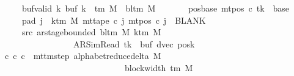 \begin{isabellebody}
\ \ \ \ \ \ \ buf{}{\isacharunderscore}{\kern0pt}valid{\isacharcolon}{\kern0pt}\ {\isachardoublequoteopen}{\isasymforall}k{\isachardot}{\kern0pt}\ buf{}\ k\ {\isasymin}\ {\isasymGamma}{\isacharunderscore}{\kern0pt}tm\ M\ {\isasymunion}\ {\isacharbraceleft}{\kern0pt}bl{\isacharunderscore}{\kern0pt}tm\ M{\isacharbraceright}{\kern0pt}{\isachardoublequoteclose}\isanewline
\ \ \ \ \ \ \ pos{\isacharunderscore}{\kern0pt}base{\isacharcolon}{\kern0pt}\ {\isachardoublequoteopen}mt{\isacharunderscore}{\kern0pt}pos\ c{\isacharprime}{\kern0pt}\ tk\ {\isacharequal}{\kern0pt}\ base{\isachardoublequoteclose}\isanewline
\ \ \ \ \ \ \ pad{}{\isacharcolon}{\kern0pt}\ {\isachardoublequoteopen}{\isasymforall}j\ {\isasymge}\ k{\isacharunderscore}{\kern0pt}tm\ M{\isachardot}{\kern0pt}\ mt{\isacharunderscore}{\kern0pt}tape\ c{\isacharprime}{\kern0pt}\ j\ {\isacharparenleft}{\kern0pt}mt{\isacharunderscore}{\kern0pt}pos\ c{\isacharprime}{\kern0pt}\ j{\isacharparenright}{\kern0pt}\ {\isacharequal}{\kern0pt}\ BLANK{}{\isachardoublequoteclose}\isanewline
\ \ \ \ \ \ \ src{}{\isacharcolon}{\kern0pt}\ {\isachardoublequoteopen}ar{\isacharunderscore}{\kern0pt}stage{\isacharunderscore}{\kern0pt}bounded\ {\isacharparenleft}{\kern0pt}bl{\isacharunderscore}{\kern0pt}tm\ M{\isacharparenright}{\kern0pt}\ {\isacharparenleft}{\kern0pt}k{\isacharunderscore}{\kern0pt}tm\ M{\isacharparenright}{\kern0pt}\isanewline
\ \ \ \ \ \ \ \ \ \ \ \ \ \ \ \ \ \ \ {\isacharparenleft}{\kern0pt}AR{\isacharunderscore}{\kern0pt}SimRead{\isacharcomma}{\kern0pt}\ tk{\isacharcomma}{\kern0pt}\ {}{\isacharcomma}{\kern0pt}\ buf{}{\isacharcomma}{\kern0pt}\ dvec{\isacharcomma}{\kern0pt}\ posk{\isacharparenright}{\kern0pt}{\isachardoublequoteclose}\isanewline
\ \ \ {\isachardoublequoteopen}{\isasymexists}c{\isacharprime}{\kern0pt}{\isacharprime}{\kern0pt}{\isachardot}{\kern0pt}\ {\isacharparenleft}{\kern0pt}c{\isacharprime}{\kern0pt}{\isacharcomma}{\kern0pt}\ c{\isacharprime}{\kern0pt}{\isacharprime}{\kern0pt}{\isacharparenright}{\kern0pt}\ {\isasymin}\ {\isacharparenleft}{\kern0pt}mttm{\isacharunderscore}{\kern0pt}step\ {\isacharparenleft}{\kern0pt}alphabet{\isacharunderscore}{\kern0pt}reduce{\isacharunderscore}{\kern0pt}delta\ M{\isacharparenright}{\kern0pt}{\isacharparenright}{\kern0pt}\isanewline
\ \ \ \ \ \ \ \ \ \ \ \ \ \ \ \ \ \ \ \ \ \ \ \ \ \ \ \ \ \ {\isacharcircum}{\kern0pt}{\isacharcircum}{\kern0pt}\ {\isacharparenleft}{\kern0pt}block{\isacharunderscore}{\kern0pt}width\ {\isacharparenleft}{\kern0pt}{\isasymGamma}{\isacharunderscore}{\kern0pt}tm\ M{\isacharparenright}{\kern0pt}\ {\isacharminus}{\kern0pt}\ {}{\isacharparenright}{\kern0pt}\isanewline

\end{isabellebody}
